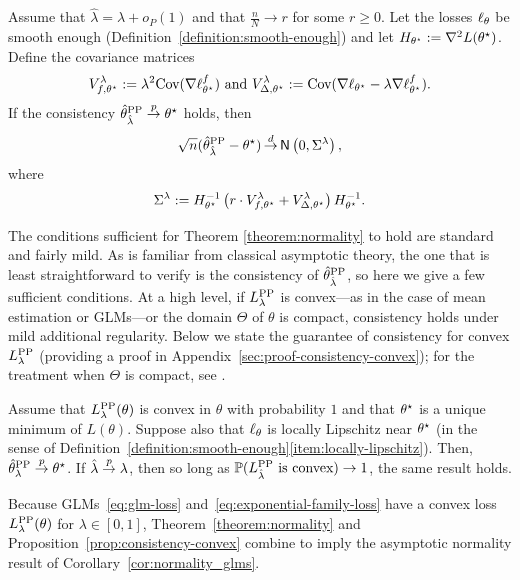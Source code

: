 \begin{theorem}
  \label{theorem:normality}
  Assume that $\hat\lambda = \lambda + o_P(1)$ and that
  $\frac{n}{N}\rightarrow r$ for some $r\geq 0$. Let the losses
  $\ell_\theta$ be
  smooth enough (Definition~\ref{definition:smooth-enough}) and let $H_{\theta^\star} := \nabla^2 L(\theta^\star)$.
  Define the covariance matrices
  \begin{align*}
    V_{f,\theta^\star}^\lambda := \lambda^2 \textup{Cov}(\nabla \ell_{\theta^\star}^f)\text{ and } V_{\Delta,\theta^\star}^\lambda  := \textup{Cov}( \nabla \ell_{\theta^\star} -  \lambda \nabla \ell_{\theta^\star}^f ).
  \end{align*}
  If the
  consistency $\hat{\theta}^{\mathrm{PP}}_{\hat \lambda} \stackrel{p}{\to} \theta^\star$ holds,
  then
  \begin{equation*}
    \sqrt{n}(\hat{\theta}^{\mathrm{PP}}_{\hat \lambda} - \theta^\star) \mathop{\stackrel{d}{\rightarrow}} \mathsf{N}\left(0, \Sigma^\lambda\right),
  \end{equation*}
  where 
  \begin{equation}
  \label{eqn:sigma-lambda}	
\Sigma^\lambda := H_{\theta^\star}^{-1} \left(r \cdot
    V_{f,\theta^\star}^\lambda +
    V_{\Delta,\theta^\star}^\lambda
    \right) H_{\theta^\star}^{-1}.
    \end{equation}
\end{theorem}

The conditions sufficient for Theorem \ref{theorem:normality} to hold are
standard and fairly mild. As is familiar from classical asymptotic theory,
the one that is least straightforward to verify is the consistency of
$\hat{\theta}^{\mathrm{PP}}_{\hat \lambda}$, so here we give a few sufficient conditions. At a
high level, if $L^{\mathrm{PP}}_\lambda$ is convex---as in the case of mean estimation
or GLMs---or the domain $\Theta$ of $\theta$ is compact, consistency holds
under mild additional regularity. Below we state the guarantee of
consistency for convex $L^{\mathrm{PP}}_\lambda$ (providing a proof in
Appendix~\ref{sec:proof-consistency-convex}); for the treatment when
$\Theta$ is compact, see \citet[Chapter 5]{VanDerVaart98}.

\begin{proposition}
  \label{prop:consistency-convex}
  Assume that $L^{\mathrm{PP}}_\lambda(\theta)$ is convex in $\theta$ with probability
  $1$ and that $\theta^\star$ is a unique minimum of $L(\theta)$.  Suppose
  also that $\ell_{\theta}$ is locally Lipschitz near $\theta^\star$
  (in the sense of
  Definition~\ref{definition:smooth-enough}\ref{item:locally-lipschitz}).
  Then, $\hat{\theta}^{\mathrm{PP}}_{\lambda} \stackrel{p}{\rightarrow}
  \theta^\star$. If $\hat{\lambda} \stackrel{p}{\rightarrow} \lambda$, then
  so long as $\mathbb{P}(L^{\mathrm{PP}}_{\hat{\lambda}} ~\mbox{is~convex}) \to 1$, the same
  result holds.
\end{proposition}
\noindent
Because GLMs~\eqref{eq:glm-loss} and~\eqref{eq:exponential-family-loss}
have a convex loss $L^{\mathrm{PP}}_\lambda(\theta)$
for $\lambda \in [0, 1]$, Theorem~\ref{theorem:normality} and
Proposition~\ref{prop:consistency-convex} combine to imply the asymptotic
normality result of Corollary~\ref{cor:normality_glms}.

